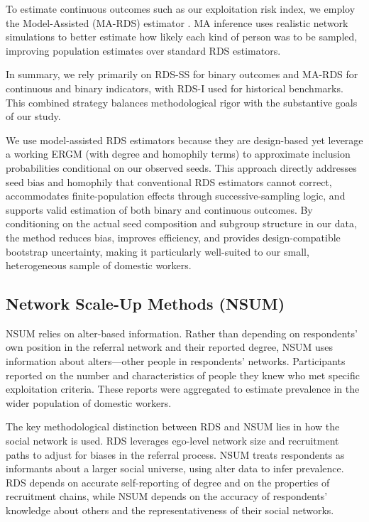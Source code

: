 \documentclass[
  12pt,
  letterpaper,
  DIV=11,
  numbers=noendperiod]{scrartcl}
\theoremstyle{plain}
\theoremstyle{definition}
\begin{document}
To estimate continuous outcomes such as our exploitation risk index, we
employ the Model-Assisted (MA-RDS) estimator \textcite{gile15-network}.
MA inference uses realistic network simulations to better estimate how
likely each kind of person was to be sampled, improving population
estimates over standard RDS estimators.

In summary, we rely primarily on RDS-SS for binary outcomes and MA-RDS
for continuous and binary indicators, with RDS-I used for historical
benchmarks. This combined strategy balances methodological rigor with
the substantive goals of our study.

We use model-assisted RDS estimators \autocite{gile15-network} because
they are design-based yet leverage a working ERGM (with degree and
homophily terms) to approximate inclusion probabilities conditional on
our observed seeds. This approach directly addresses seed bias and
homophily that conventional RDS estimators cannot correct, accommodates
finite-population effects through successive-sampling logic, and
supports valid estimation of both binary and continuous outcomes. By
conditioning on the actual seed composition and subgroup structure in
our data, the method reduces bias, improves efficiency, and provides
design-compatible bootstrap uncertainty, making it particularly
well-suited to our small, heterogeneous sample of domestic workers.

\subsection{Network Scale-Up Methods
(NSUM)}\label{network-scale-up-methods-nsum}

NSUM relies on alter-based information. Rather than depending on
respondents' own position in the referral network and their reported
degree, NSUM uses information about alters---other people in
respondents' networks. Participants reported on the number and
characteristics of people they knew who met specific exploitation
criteria. These reports were aggregated to estimate prevalence in the
wider population of domestic workers.

The key methodological distinction between RDS and NSUM lies in how the
social network is used. RDS leverages ego-level network size and
recruitment paths to adjust for biases in the referral process. NSUM
treats respondents as informants about a larger social universe, using
alter data to infer prevalence. RDS depends on accurate self-reporting
of degree and on the properties of recruitment chains, while NSUM
depends on the accuracy of respondents' knowledge about others and the
representativeness of their social networks.
\end{document}
